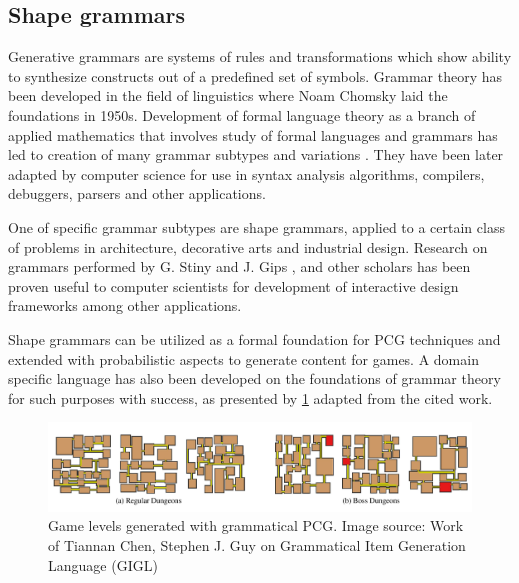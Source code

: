 \documentclass[12pt]{report}
\begin{document}
\subsection{Shape grammars}

Generative grammars are systems of rules and transformations which show ability to synthesize constructs out of a predefined set of symbols. Grammar theory has been developed in the field of linguistics where Noam Chomsky laid the foundations in 1950s. Development of formal language theory as a branch of applied mathematics that involves study of formal languages and grammars has led to creation of many grammar subtypes and variations \autocite{Harrison:1978:IFL:578595}. They have been later adapted by computer science for use in syntax analysis algorithms, compilers, debuggers, parsers and other applications. 

One of specific grammar subtypes are shape grammars, applied to a certain class of problems in architecture, decorative arts and industrial design. Research on grammars performed by G. Stiny and J. Gips \autocite{Stiny1980IntroductionTS}, \autocite{stiny1971shape} and other scholars has been proven useful to computer scientists for development of interactive design frameworks \autocite{Dang:2015:IDP:2816795.2818069} among other applications. 

Shape grammars can be utilized as a formal foundation for PCG techniques and extended with probabilistic aspects \autocite{sportelli2014} to generate content for games. A domain specific language has also been developed on the foundations of grammar theory \autocite{Chen2018GIGLAD} for such purposes with success, as presented by \cref{fig:gigladomainspecificlanguagefor201904231555971576} adapted from the cited work. 

\begin{figure}[h]
	\centering
	\includegraphics[width=\textwidth]{images/GIGL_A_Domain_Specific_Language_for_2019_04_23_1555971576}
	\caption{Game levels generated with grammatical PCG. Image source: Work of Tiannan Chen, Stephen J. Guy on Grammatical Item Generation Language (GIGL) \autocite{Chen2018GIGLAD} }
	\label{fig:gigladomainspecificlanguagefor201904231555971576}
\end{figure}
\end{document}
